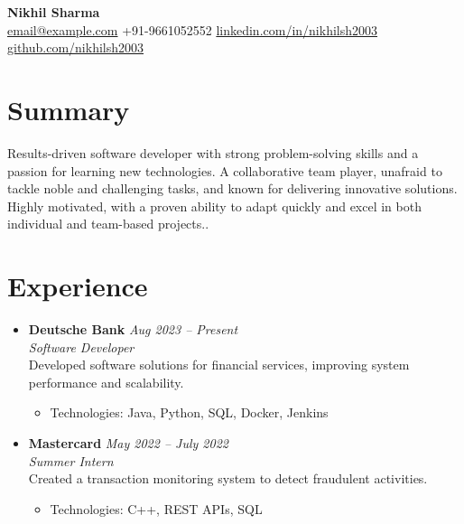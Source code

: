 \documentclass[a4paper,10pt]{article} %
\begin{document}
\begin{center}
    {\Huge \textbf{Nikhil Sharma}} \\
    \vspace{6pt} %
    \small
    \faEnvelope \href{mailto:email@example.com}{email@example.com} \hspace{1.5em} %
    \faMobile \hspace{0.3em} +91-9661052552 \hspace{1.5em} %
    \faLinkedinSquare \href{https://www.linkedin.com/in/nikhilsh2003/}{linkedin.com/in/nikhilsh2003} \hspace{1.5em} %
    \faGithub \href{https://github.com/nikhilsh2003}{github.com/nikhilsh2003} %
\end{center}

\vspace{0.7em} %

\section*{Summary}
Results-driven software developer with strong problem-solving skills and a passion for learning new technologies. A collaborative team player, unafraid to tackle noble and challenging tasks, and known for delivering innovative solutions. Highly motivated, with a proven ability to adapt quickly and excel in both individual and team-based projects..

\vspace{0.7em} %

\section*{Experience}
\begin{itemize}[leftmargin=0.3in, itemsep=3pt, topsep=2pt] %
    \item
    \textbf{Deutsche Bank} \hfill \textit{Aug 2023 – Present} \\
    \textit{Software Developer} \\
    Developed software solutions for financial services, improving system performance and scalability.
    \begin{itemize}[leftmargin=*]
        \item Technologies: Java, Python, SQL, Docker, Jenkins
    \end{itemize}

    \item
    \textbf{Mastercard} \hfill \textit{May 2022 – July 2022} \\
    \textit{Summer Intern} \\
    Created a transaction monitoring system to detect fraudulent activities.
    \begin{itemize}[leftmargin=*]
        \item Technologies: C++, REST APIs, SQL
    \end{itemize}
\end{itemize}
\end{document}

